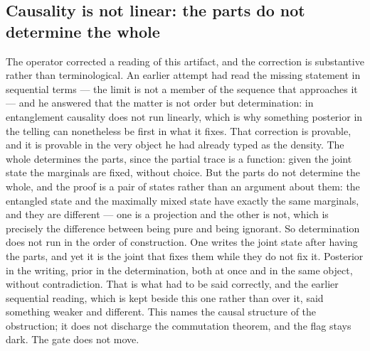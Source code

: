 \documentclass[11pt]{article}
\theoremstyle{definition}\newtheorem{deriv}{Derivation}
\begin{document}
\subsection*{Causality is not linear: the parts do not determine the whole}The operator corrected a reading of this artifact, and the correction is substantive rather than terminological. An earlier attempt had read the missing statement in sequential terms --- the limit is not a member of the sequence that approaches it --- and he answered that the matter is not order but determination: in entanglement causality does not run linearly, which is why something posterior in the telling can nonetheless be first in what it fixes. That correction is provable, and it is provable in the very object he had already typed as the density. The whole determines the parts, since the partial trace is a function: given the joint state the marginals are fixed, without choice. But the parts do not determine the whole, and the proof is a pair of states rather than an argument about them: the entangled state and the maximally mixed state have exactly the same marginals, and they are different --- one is a projection and the other is not, which is precisely the difference between being pure and being ignorant. So determination does not run in the order of construction. One writes the joint state after having the parts, and yet it is the joint that fixes them while they do not fix it. Posterior in the writing, prior in the determination, both at once and in the same object, without contradiction. That is what had to be said correctly, and the earlier sequential reading, which is kept beside this one rather than over it, said something weaker and different. This names the causal structure of the obstruction; it does not discharge the commutation theorem, and the flag stays dark. The gate does not move.
\end{document}

